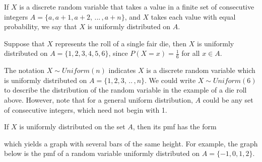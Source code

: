 \begin{defn} If $X$ is a discrete random variable that takes a value in a finite set of consecutive integers $A = \{a, a+1, a+2, \, ... \, , a+n\}$, and $X$ takes each value with equal probability, we say that $X$ is uniformly distributed on $A$. \end{defn}

\begin{examp} Suppose that $X$ represents the roll of a single fair die, then $X$ is uniformly distributed on $A = \{1,2,3,4,5,6\}$, since $P(X = x) = \frac{1}{6}$ for all $x \in A$.
\end{examp}

The notation $X \sim Uniform(n)$ indicates $X$ is a discrete random variable which is uniformly distributed on $A = \{1,2,3, \, .. \,, n\}$. We could write $X \sim Uniform(6)$ to describe the distribution of the random variable in the example of a die roll above. However, note that for a general uniform distribution, $A$ could be any set of consecutive integers, which need not begin with 1.
\par
If $X$ is uniformly distributed on the set $A$, then its pmf has the form
\renewcommand*{\arraystretch}{1.35}
\renewcommand*{\arraystretch}{1}
\par
\noindent which yields a graph with several bars of the same height. For example, the graph below is the pmf of a random variable uniformly distributed on $A = \{-1,0,1,2\}$.

\begin{center}
\end{center}

